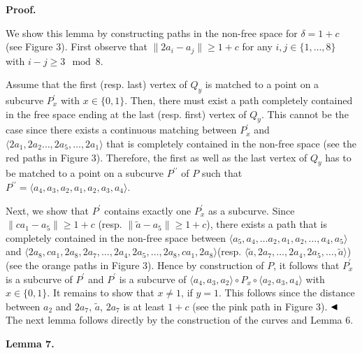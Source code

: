 \par\medskip\noindent\textbf{Proof.}\par
We show this lemma by constructing paths in the non-free space for $\delta=1+c$ (see Figure 3). First observe that $\|2a_{i}-a_{j}\|\geq 1+c$ for any $i,j\in\{1,\dots,8\}$ with ${i-j\geq 3\mod 8}$.
\par
\par
Assume that the first (resp. last) vertex of $Q_{y}$ is matched to a point on a subcurve $P^{\prime}_{x}$ with $x\in\{0,1\}$. Then, there must exist a path completely contained in the free space ending at the last (resp. first) vertex of $Q_{y}$. This cannot be the case since there exists a continuous matching between $P^{\prime}_{x}$ and $\langle 2a_{1},2a_{2}\dots,2a_{5},\dots,2a_{1}\rangle$ that is completely contained in the non-free space (see the red paths in Figure 3). Therefore, the first as well as the last vertex of $Q_{y}$ has to be matched to a point on a subcurve $P^{\prime\prime}$ of $P$ such that $P^{\prime\prime}=\langle a_{4},a_{3},a_{2},a_{1},a_{2},a_{3},a_{4}\rangle$.
\par
\par
Next, we show that $P^{\prime}$ contains exactly one $P^{\prime}_{x}$ as a subcurve. Since $\|ca_{1}-a_{5}\|\geq 1+c$ (resp. $\|\tilde{a}-a_{5}\|\geq 1+c$), there exists a path that is completely contained in the non-free space between $\langle a_{5},a_{4},\dots a_{2},a_{1},a_{2},\dots,a_{4},a_{5}\rangle$ and $\langle 2a_{8},ca_{1},2a_{8},2a_{7},\dots,2a_{4},2a_{5},\dots,2a_{8},ca_{1},2a%
_{8}\rangle$(resp. $\langle\tilde{a},2a_{7},\dots,2a_{4},2a_{5},\dots,\tilde{a}\rangle$) (see the orange paths in Figure 3). Hence by construction of $P$, it follows that $P^{\prime}_{x}$ is a subcurve of $P^{\prime}$ and $P^{\prime}$ is a subcurve of $\langle a_{4},a_{3},a_{2}\rangle\circ P_{x}\circ\langle a_{2},a_{3},a_{4}\rangle$ with $x\in\{0,1\}$. It remains to show that $x\neq 1$, if $y=1$. This follows since the distance between $a_{2}$ and $2a_{7}$, $\tilde{a}$, $2a_{7}$ is at least $1+c$ (see the pink path in Figure 3). $\hfill\blacktriangleleft$ The next lemma follows directly by the construction of the curves and Lemma 6.
\par
\par
\par\medskip\noindent\textbf{Lemma 7.}\par
